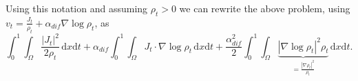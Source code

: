 Using this notation and assuming $\rho_t > 0$ we can rewrite the above problem, using $v_t = \frac{J_t}{\rho_t} + \alpha_{dif}\nabla\log\rho_t$, as
$$
\int_0^1\int_\Omega \frac{|J_t|^2}{2\rho_t} \,\mathrm{d}x\mathrm{d}t + \alpha_{dif}\int_0^1\int_\Omega J_t \cdot \nabla\log\rho_t\,\mathrm{d}x\mathrm{d}t + \frac{\alpha_{dif}^2}{2}\int_0^1\int_\Omega \underbrace{|\nabla\log\rho_t|^2\rho_t}_{=\frac{|\nabla\rho_t|^2}{\rho_t}}\,\mathrm{d}x\mathrm{d}t.
$$
%

